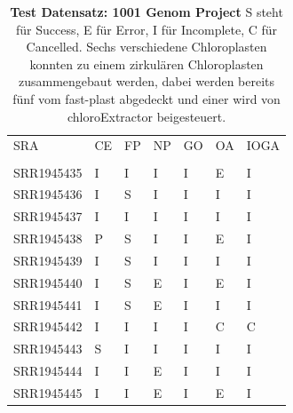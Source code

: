 \documentclass{scrartcl}
\begin{document}
\begin{table}[!h]
\caption[Test Datensatz: 1001 Genom Project, 11 Datensätze]{\textbf{Test Datensatz: 1001 Genom Project} S steht für Success, E für Error, I für Incomplete, C für Cancelled. Sechs verschiedene Chloroplasten konnten zu einem zirkulären Chloroplasten zusammengebaut werden, dabei werden bereits fünf vom fast-plast abgedeckt und einer wird von chloroExtractor beigesteuert. }


\begin{center}
\begin{tabular}{lllllll}
SRA & CE & FP & NP & GO & OA & IOGA\\
 &  &  &  &  &  & \\
\hline
SRR1945435 & I & I & I & I & E & I\\
SRR1945436 & I & S & I & I & I & I\\
SRR1945437 & I & I & I & I & I & I\\
SRR1945438 & P & S & I & I & E & I\\
SRR1945439 & I & S & I & I & I & I\\
SRR1945440 & I & S & E & I & E & I\\
SRR1945441 & I & S & E & I & I & I\\
SRR1945442 & I & I & I & I & C & C\\
SRR1945443 & S & I & I & I & I & I\\
SRR1945444 & I & I & E & I & I & I\\
SRR1945445 & I & I & E & I & E & I\\
\end{tabular}
\end{center}
\end{table}
\end{document}
